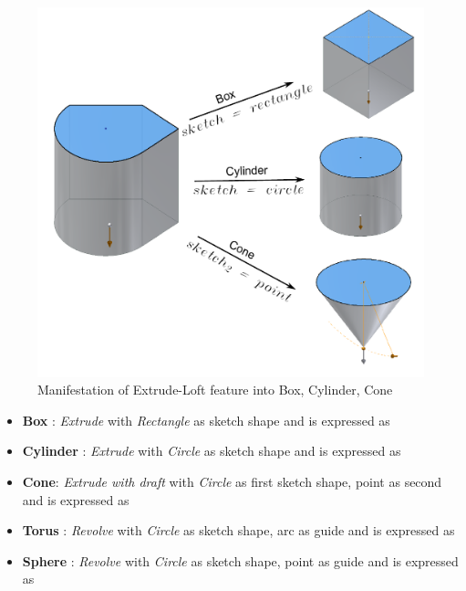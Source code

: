 \begin{figure}[htbp]
\centering
	\includegraphics[scale=0.55]{../Common/images//ExtrudeBoxCylCone.pdf} 
\caption{Manifestation of  Extrude-Loft feature into Box, Cylinder, Cone}
\label{fig:abstraction:boxcylconeasextrude}
\end{figure}


\begin{itemize}[noitemsep,topsep=2pt,parsep=2pt,partopsep=2pt]
\item {\bf Box} : {\em Extrude} with {\em Rectangle} as sketch shape and is expressed as 

\item {\bf Cylinder} : {\em Extrude} with {\em Circle} as sketch shape and is expressed as 

\item {\bf Cone}: {\em Extrude with draft} with {\em Circle} as first sketch shape, point as second and is expressed as 

\item {\bf Torus} : {\em Revolve} with {\em Circle} as sketch shape, arc as guide and is expressed as 

\item {\bf Sphere} : {\em Revolve} with {\em Circle} as sketch shape, point as guide and is expressed as

\end{itemize}

